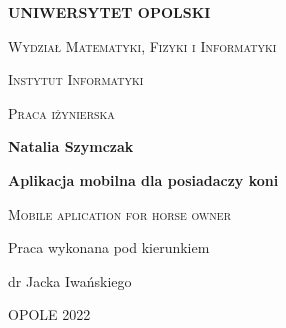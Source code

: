 \documentclass[12pt,twoside]{report}
\begin{document}
	\begin{titlepage}
		
		\begin{center}
			\begin{figure}[t]
				\centering
			\end{figure}
		\end{center}
		
		\begin{center}
			{\LARGE  \bf \textsc{UNIWERSYTET OPOLSKI}}
		\end{center}
		\vspace{0.2cm}
		\begin{center}
			{\large \textsc{Wydział Matematyki, Fizyki i Informatyki}}
		\end{center}
		\begin{center}
			{\Large \textsc{Instytut Informatyki}}
		\end{center}
		\vspace{0.5cm}
		\begin{center}
			\large    \textsc{Praca iżynierska}
		\end{center}
		\vspace{0.4cm}
		\begin{center}
			\large \textbf{Natalia Szymczak}
		\end{center}
		
		\vspace{0.4cm}
		\begin{center}
			\Large     \textbf{Aplikacja mobilna dla posiadaczy koni}
		\end{center}
		\vspace{0.1cm}
		
		\begin{center}
			\large     \textsc{Mobile aplication for horse owner}
		\end{center}
		\vspace{1.3cm}
		
		\begin{flushright}
			{\large Praca wykonana pod kierunkiem\bigskip
				
				{\bf }} 
			dr Jacka Iwańskiego
		\end{flushright}
		\vspace{0.7cm}
		\begin{center}
			{\large OPOLE 2022}
		\end{center}
	\end{titlepage}
\end{document}
